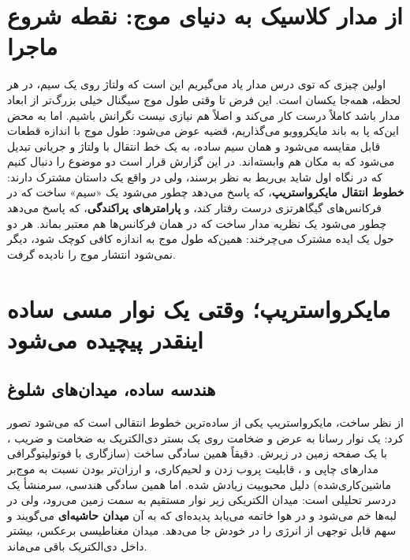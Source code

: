 \documentclass[12pt]{article}
\begin{document}
	\sloppy 
	
	
	
	\newpage
	\tableofcontents
	\newpage
	
	\section{از مدار کلاسیک به دنیای موج: نقطه شروع ماجرا}
	اولین چیزی که توی درس مدار یاد می‌گیریم این است که ولتاژ روی یک سیم، در هر لحظه، همه‌جا یکسان است. این فرض تا وقتی طول موج سیگنال خیلی بزرگ‌تر از ابعاد مدار باشد کاملاً درست کار می‌کند و اصلاً هم نیازی نیست نگرانش باشیم. اما به محض این‌که پا به باند مایکروویو می‌گذاریم، قضیه عوض می‌شود: طول موج با اندازه قطعات قابل مقایسه می‌شود و همان سیم ساده، به یک خط انتقال با ولتاژ و جریانی تبدیل می‌شود که به مکان هم وابسته‌اند. در این گزارش قرار است دو موضوع را دنبال کنیم که در نگاه اول شاید بی‌ربط به نظر برسند، ولی در واقع یک داستان مشترک دارند: \textbf{خطوط انتقال مایکرواستریپ}، که پاسخ می‌دهد چطور می‌شود یک «سیم» ساخت که در فرکانس‌های گیگاهرتزی درست رفتار کند، و \textbf{پارامترهای پراکندگی}، که پاسخ می‌دهد چطور می‌شود یک نظریه مدار ساخت که در همان فرکانس‌ها هم معتبر بماند. هر دو حول یک ایده مشترک می‌چرخند: همین‌که طول موج \lr{$\lambda$} به اندازه کافی کوچک شود، دیگر نمی‌شود انتشار موج را نادیده گرفت.
	

	\section{مایکرواستریپ؛ وقتی یک نوار مسی ساده اینقدر پیچیده می‌شود}

	
	\subsection{هندسه ساده، میدان‌های شلوغ}
	
	از نظر ساخت، مایکرواستریپ یکی از ساده‌ترین خطوط انتقالی است که می‌شود تصور کرد: یک نوار رسانا به عرض  و ضخامت  روی یک بستر دی‌الکتریک به ضخامت  و ضریب ، با یک صفحه زمین در زیرش. دقیقاً همین سادگی ساخت (سازگاری با فوتولیتوگرافی مدارهای چاپی و ، قابلیت پروب زدن و لحیم‌کاری، و ارزان‌تر بودن نسبت به موج‌بر ماشین‌کاری‌شده) دلیل محبوبیت زیادش شده. اما همین سادگی هندسی، سرمنشأ یک دردسر تحلیلی است: میدان الکتریکی زیر نوار مستقیم به سمت زمین می‌رود، ولی در لبه‌ها خم می‌شود و در هوا خاتمه می‌یابد  پدیده‌ای که به آن \textbf{میدان حاشیه‌ای} می‌گویند و سهم قابل توجهی از انرژی را در خودش جا می‌دهد. میدان مغناطیسی برعکس، بیشتر داخل دی‌الکتریک باقی می‌ماند.
	
\end{document}
